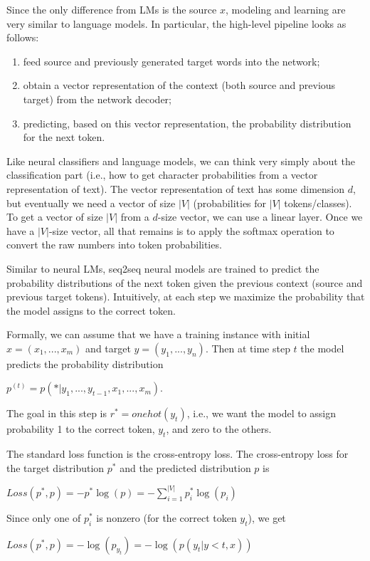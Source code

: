\documentclass{article}
\begin{document}
Since the only difference from LMs is the source $x$, modeling and learning are very similar to language models. In particular, the high-level pipeline looks as follows:
\begin{enumerate}
\item feed source and previously generated target words into the network;
\item obtain a vector representation of the context (both source and previous target) from the network decoder;
\item predicting, based on this vector representation, the probability distribution for the next token.
\end{enumerate}

Like neural classifiers and language models, we can think very simply about the classification part (i.e., how to get character probabilities from a vector representation of text). The vector representation of text has some dimension $d$, but eventually we need a vector of size $|V|$ (probabilities for $|V|$ tokens/classes). To get a vector of size $|V|$ from a $d$-size vector, we can use a linear layer. Once we have a $|V|$-size vector, all that remains is to apply the softmax operation to convert the raw numbers into token probabilities.

Similar to neural LMs, seq2seq neural models are trained to predict the probability distributions of the next token given the previous context (source and previous target tokens). Intuitively, at each step we maximize the probability that the model assigns to the correct token.

Formally, we can assume that we have a training instance with initial $x = (x_1,...,x_m)$ and target $y = (y_1,...,y_n)$. Then at time step $t$ the model predicts the probability distribution
\begin{center}
$p^{(t)}=p(*|y_1,...,y_{t-1}, x_1,...,x_m)$.
\end{center}

The goal in this step is $r^* = onehot(y_t)$, i.e., we want the model to assign probability 1 to the correct token, $y_t$, and zero to the others.

The standard loss function is the cross-entropy loss. The cross-entropy loss for the target distribution $p^*$ and the predicted distribution $p$ is
\begin{center}
    $ Loss(p^*,p) = -p^*\log(p) = -\sum_{i = 1}^{|V|}p^{*}_{i} \log(p_i)$
\end{center}

Since only one of $p_{i}^{*}$ is nonzero (for the correct token $y_t$), we get
\begin{center}
    $ Loss(p^*,p) = -\log(p_{y_t}) = -\log(p(y_t|y<t,x))$
\end{center}
\end{document}
